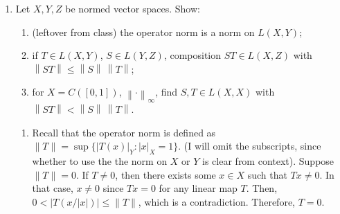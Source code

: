 \documentclass[11pt]{article}
\newcommand{\C}{\mathbb{C}}
\newcommand{\norm}[1]{\left\lVert #1 \right\rVert}
\begin{document}
\begin{enumerate}[label=\arabic*., leftmargin=*, itemsep=10pt]
\begin{enumerate}
        Next, let $\lambda \in \C$.
        Then, $(\lambda f)' = \lambda f'$.
        We compute:
        \[
        \|\lambda f\|_{0} = |\lambda f(0)| + \sup_{x \in [0, 1]} |\lambda f'(x)| = |\lambda| |f(0)| +|\lambda| \sup_{x \in [0, 1]} |f'(x)| = |\lambda| \|f\|_0
        .\] 
        Finally, by the linearity of the derivative, and the fact that $\|\cdot \|_{\infty}$ is a norm over continuous function son $[0, 1]$ (we checked this in class),we compute the triangle inequality:
        \begin{align*}
            \|f + g\|_0 = |f(0) + g(0)| + \|(f + g)'\|_{\infty} &\leq |f(0)| + |g(0)| + \|f' + g'\|_{\infty}\\
            &\leq |f(0)| + |g(0)| + \|f'\|_{\infty} + \|g'\|_{\infty}\\
            &= \|f\|_{0} + \|g\|_{0}
        .\end{align*}
    \item First, we have
        \[
        \|f\|_{0} = |f(0)| + \|f'\|_{\infty} \leq \|f\|_{\infty} + \|f'\|_{\infty} = \|f\|_{C^{1}}
        .\] 
        Next, by the MVT we have that for all $x \in (0, 1]$, we have that
        \[
        |f(x)| - |f(0)| \leq |f(x) - f(0)| = |f'(x)| x \leq |f'(x)| \leq \|f'\|_{\infty}
        .\] 
        therefore, $|f(x)|\leq \|f'\|_{\infty} + |f(0)|$.
        Since this applies for all $x > 0$, combined with $|f(0)| \leq \|f'\|_{\infty} + |f(0)|$, we have that $\|f\|_{\infty} \leq \|f'\| + |f(0)|$
        Thus,
        \[
            \|f\|_{C^{1}} = \|f\|_{\infty} + \|f'\|_{\infty} \leq (|f(0)| + \|f'\|_{\infty}) + \|f'\|_{\infty} \leq 2(|f(0)| + \|f'\|_{\infty}) = 2 \|f\|_{0}
        .\] 
        Therefore, $\|f\|_{0} \leq \|f\|_{C^{1}} \leq 2\|f\|_{0}$, which proves these two norms are equivalent.
\end{enumerate}

\item Let $X,Y,Z$ be normed vector spaces. Show:
\begin{enumerate}[label=(\alph*), itemsep=4pt]
\item (leftover from class) the operator norm is a norm on $L(X,Y)$;
\item if $T\in L(X,Y)$, $S\in L(Y,Z)$, composition $ST\in L(X,Z)$ with $\norm{ST}\le \norm{S}\,\norm{T}$;
\item for $X=C([0,1])$, $\norm{\cdot}_\infty$, find $S,T\in L(X,X)$ with $\norm{ST}<\norm{S}\,\norm{T}$.
\end{enumerate}


\begin{enumerate}
    \item Recall that the operator norm is defined as $\|T\| = \sup \{|T(x)|_Y : |x|_{X} = 1\}$.
        (I will omit the subscripts, since whether to use the the norm on $X$ or $Y$ is clear from context).
        Suppose $\|T\| = 0$.
        If $T \neq 0$, then there exists some $x \in X$ such that $Tx \neq 0$. In that case, $x \neq 0$ since $Tx = 0$ for any linear map $T$.
        Then, $0 < |T (x / |x|)| \leq \|T\|$, which is a contradiction. Therefore, $T= 0$.


\end{enumerate}
\end{enumerate}
\end{document}
